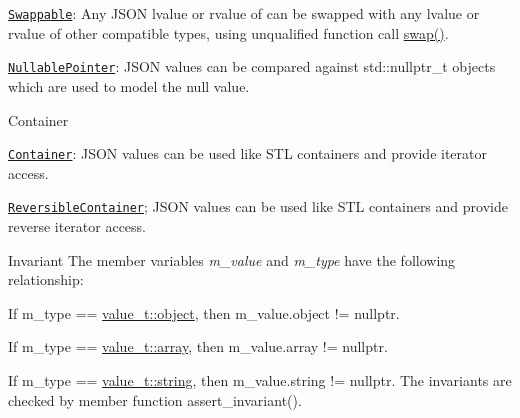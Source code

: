 \begin{DoxyItemize}
\begin{DoxyItemize}
\item \href{http://en.cppreference.com/w/cpp/concept/Swappable}{\tt Swappable}\+: Any J\+S\+ON lvalue or rvalue of can be swapped with any lvalue or rvalue of other compatible types, using unqualified function call \hyperlink{classnlohmann_1_1basic__json_a66d4de311f79f2fe640793ab7a178781}{swap()}.
\item \href{http://en.cppreference.com/w/cpp/concept/NullablePointer}{\tt Nullable\+Pointer}\+: J\+S\+ON values can be compared against {\ttfamily std\+::nullptr\+\_\+t} objects which are used to model the {\ttfamily null} value.
\end{DoxyItemize}
\item Container
\begin{DoxyItemize}
\item \href{http://en.cppreference.com/w/cpp/concept/Container}{\tt Container}\+: J\+S\+ON values can be used like S\+TL containers and provide iterator access.
\item \href{http://en.cppreference.com/w/cpp/concept/ReversibleContainer}{\tt Reversible\+Container}; J\+S\+ON values can be used like S\+TL containers and provide reverse iterator access.
\end{DoxyItemize}
\end{DoxyItemize}

\begin{DoxyInvariant}{Invariant}
The member variables {\itshape m\+\_\+value} and {\itshape m\+\_\+type} have the following relationship\+:
\begin{DoxyItemize}
\item If {\ttfamily m\+\_\+type == \hyperlink{namespacenlohmann_1_1detail_a90aa5ef615aa8305e9ea20d8a947980faa8cfde6331bd59eb2ac96f8911c4b666}{value\+\_\+t\+::object}}, then {\ttfamily m\+\_\+value.\+object != nullptr}.
\item If {\ttfamily m\+\_\+type == \hyperlink{namespacenlohmann_1_1detail_a90aa5ef615aa8305e9ea20d8a947980faf1f713c9e000f5d3f280adbd124df4f5}{value\+\_\+t\+::array}}, then {\ttfamily m\+\_\+value.\+array != nullptr}.
\item If {\ttfamily m\+\_\+type == \hyperlink{namespacenlohmann_1_1detail_a90aa5ef615aa8305e9ea20d8a947980fab45cffe084dd3d20d928bee85e7b0f21}{value\+\_\+t\+::string}}, then {\ttfamily m\+\_\+value.\+string != nullptr}. The invariants are checked by member function assert\+\_\+invariant().
\end{DoxyItemize}
\end{DoxyInvariant}


